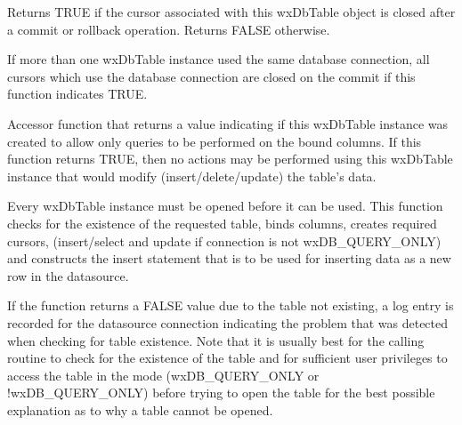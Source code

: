 Returns TRUE if the cursor associated with this wxDbTable object is closed
after a commit or rollback operation.  Returns FALSE otherwise.


If more than one wxDbTable instance used the same database connection, all cursors
which use the database connection are closed on the commit if this function
indicates TRUE.

\label{wxdbtableisqueryonly}


Accessor function that returns a value indicating if this wxDbTable instance
was created to allow only queries to be performed on the bound columns.  If
this function returns TRUE, then no actions may be performed using this
wxDbTable instance that would modify (insert/delete/update) the table's data.

\label{wxdbtableopen}


Every wxDbTable instance must be opened before it can be used.  This function
checks for the existence of the requested table, binds columns, creates required
cursors, (insert/select and update if connection is not wxDB\_QUERY\_ONLY) and
constructs the insert statement that is to be used for inserting data as a new
row in the datasource.





If the function returns a FALSE value due to the table not existing, a log
entry is recorded for the datasource connection indicating the problem
that was detected when checking for table existence.  Note that it is usually
best for the calling routine to check for the existence of the table and for
sufficient user privileges to access the table in the mode (wxDB\_QUERY\_ONLY or
!wxDB\_QUERY\_ONLY) before trying to open the table for the best possible
explanation as to why a table cannot be opened.

